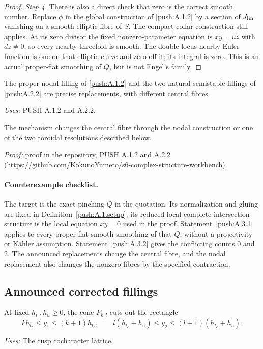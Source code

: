\begin{proof}
\par\noindent\textit{Step 4.} There is also a direct check that zero is the correct smooth
number. Replace $\phi$ in the global construction of \ref{push:A.1.2}
by a section of $J_{\rm lin}$ vanishing on a smooth elliptic fibre of
$S$. The compact collar construction still applies. At its
zero divisor the fixed nonzero-parameter equation is $xy=uz$
with $dz\ne0$, so every nearby threefold is smooth. The
double-locus nearby Euler function is one on that elliptic
curve and zero off it; its integral is zero. This is an actual
proper-flat smoothing of $Q$, but is not Engel's family.
\end{proof}

\begin{announcement}\label{push:A.3.2.replacement}
The proper nodal
filling of \ref{push:A.1.2} and the two natural semistable fillings of
\ref{push:A.2.2} are precise replacements, with different central fibres.
\end{announcement}
\noindent\emph{Uses:} PUSH A.1.2 and A.2.2.\par
The mechanism changes the central fibre through the nodal construction or one of the two toroidal resolutions described below.

\noindent\emph{Proof:} proof in the repository, PUSH A.1.2 and A.2.2 (\url{https://github.com/KokunoYumeto/s6-complex-structure-workbench}).
\paragraph{Counterexample checklist.}
The target is the exact pinching $Q$ in the quotation. Its normalization
and gluing are fixed in Definition~\ref{push:A.1.setup}; its reduced local
complete-intersection structure is the local equation $xy=0$ used in
the proof. Statement~\ref{push:A.3.1} applies to every proper flat smooth
smoothing of that $Q$, without a projectivity or K\"ahler assumption.
Statement~\ref{push:A.3.2} gives the conflicting counts $0$ and $2$.
The announced replacements change the central fibre, and the nodal
replacement also changes the nonzero fibres by the specified contraction.
\subsection{Announced corrected fillings}
\begin{definition}\label{push:A.1.fan}
At fixed $h_{t_c},h_u\geq0$, the cone $P_{k,l}$ cuts out the rectangle
\[
 kh_{t_c}\leq y_1\leq(k+1)h_{t_c},\qquad
 l(h_{t_c}+h_u)\leq y_2\leq(l+1)(h_{t_c}+h_u).
\]
\end{definition}
\noindent\emph{Uses:} The cusp cocharacter lattice.\par

